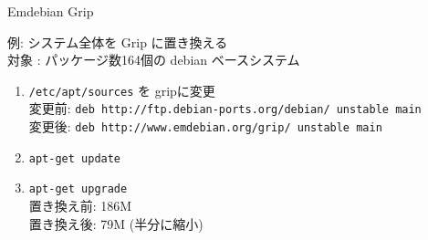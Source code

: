 \begin{frame}[containsverbatim]{Emdebian Grip}

例: システム全体を Grip に置き換える\\
  対象 : パッケージ数164個の debian ベースシステム
\begin{enumerate}
\item \texttt{/etc/apt/sources} を gripに変更\\
変更前: \texttt{deb http://ftp.debian-ports.org/debian/ unstable main}\\
変更後: \texttt{deb http://www.emdebian.org/grip/ unstable main}\\
\item \texttt{apt-get update}
\item \texttt{apt-get upgrade}\\
     置き換え前: 186M \\
     置き換え後: 79M (半分に縮小)\\
\end{enumerate}
\end{frame}

